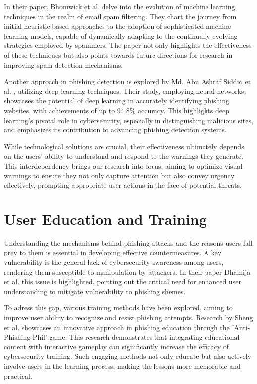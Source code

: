 \documentclass[
  a4paper,  %
  twoside,  %
  bibliography=totoc,
  headsepline,
  cleardoublepage=empty,
  parskip=half,
  draft=false
]{scrbook}
\begin{document}
In their paper, Bhomwick et al. \cite{alexy} delve into the evolution of machine learning techniques in the realm of email spam filtering. They chart the journey from initial heuristic-based approaches to the adoption of sophisticated machine learning models, capable of dynamically adapting to the continually evolving strategies employed by spammers. The paper not only highlights the effectiveness of these techniques but also points towards future directions for research in improving spam detection mechanisms.

Another approach in phishing detection is explored by Md. Abu Ashraf Siddiq et al. \cite{siddiq}, utilizing deep learning techniques. Their study, employing neural networks, showcases the potential of deep learning in accurately identifying phishing websites, with achievements of up to 94.8\% accuracy. This highlights deep learning's pivotal role in cybersecurity, especially in distinguishing malicious sites, and emphasizes its contribution to advancing phishing detection systems.

While technological solutions are crucial, their effectiveness ultimately depends on the users' ability to understand and respond to the warnings they generate. This interdependency brings our research into focus, aiming to optimize visual warnings to ensure they not only capture attention but also convey urgency effectively, prompting appropriate user actions in the face of potential threats.

\section{User Education and Training}
Understanding the mechanisms behind phishing attacks and the reasons users fall prey to them is essential in developing effective countermeasures. A key vulnerability is the general lack of cybersecurity awareness among users, rendering them susceptible to manipulation by attackers. In their paper Dhamija et al. \cite{dhamija} this issue is highlighted, pointing out the critical need for enhanced user understanding to mitigate vulnerability to phishing shemes. 

To adress this gap, various training methods have been explored, aiming to improve user ability to recognize and resist phishing attempts. Research by Sheng et al. \cite{sheng} showcases an innovative approach in phishing education through the 'Anti-Phishing Phil' game. This research demonstrates that integrating educational content with interactive gameplay can significantly increase the efficacy of cybersecurity training. Such engaging methods not only educate but also actively involve users in the learning process, making the lessons more memorable and practical. 
\end{document}
